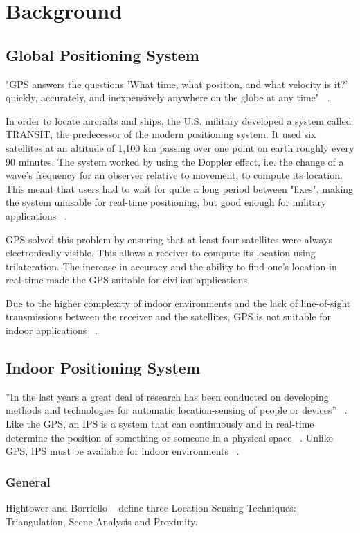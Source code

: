 \chapter{Background}

\section{Global Positioning System}
"GPS answers the questions 'What time, what position, and what velocity is it?' quickly, accurately, and inexpensively anywhere on the globe at any time" ~\cite{Hofmann}.  

In order to locate aircrafts and ships, the U.S. military developed a system called TRANSIT, the predecessor of the modern positioning system. It used six satellites at an altitude of 1,100 km passing over one point on earth roughly every 90 minutes. The system worked by using the Doppler effect, i.e. the change of a wave's frequency for an observer relative to movement, to compute its location. This meant that users had to wait for quite a long period between "fixes", making the system unusable for real-time positioning, but good enough for military applications ~\cite{Hofmann}. 

GPS solved this problem by ensuring that at least four satellites were always electronically visible. This allows a receiver to compute its location using trilateration. The increase in accuracy and the ability to find one’s location in real-time made the GPS suitable for civilian applications. 

Due to the higher complexity of indoor environments and the lack of line-of-sight transmissions between the receiver and the satellites, GPS is not suitable for indoor applications ~\cite{Gu}.

\section{Indoor Positioning System}
”In the last years a great deal of research has been conducted on developing methods and technologies for automatic location-sensing of people or devices” ~\cite{Flora}. Like the GPS, an IPS is a system that can continuously and in real-time determine the position of something or someone in a physical space ~\cite{Depsey}. Unlike GPS, IPS must be available for indoor environments ~\cite{Gu}. 

\subsection{General}
Hightower and Borriello ~\cite{Hightower} define three Location Sensing Techniques: Triangulation, Scene Analysis and Proximity. 


